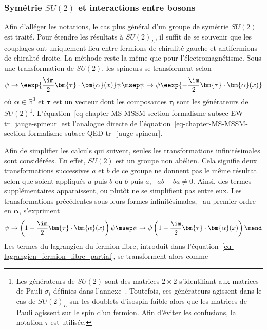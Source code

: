 \subsubsection{Symétrie $SU(2)$ et interactions entre bosons}\label{chapter-MS-MSSM-section-formalisme-subsec-EW-SU2_general}
Afin d'alléger les notations, le cas plus général d'un groupe de symétrie $SU(2)$ est traité. Pour étendre les résultats à $SU(2)_L$, il suffit de se souvenir que les couplages ont uniquement lieu entre fermions de chiralité gauche et antifermions de chiralité droite.
La méthode reste la même que pour l'électromagnétisme.
Sous une transformation de $SU(2)$, les spineurs se transforment selon
\begin{equation}
\psi \to \eexp{\frac{\im}{2}\bm{\tau}\cdot\bm{\alpha}(x)}\psi
\msep
\bar{\psi} \to \bar{\psi}\eexp{-\frac{\im}{2}\bm{\tau}\cdot\bm{\alpha}(x)}
\label{eq-chapter-MS-MSSM-section-formalisme-subsec-EW-tr_jauge-spineur}
\end{equation}
où $\bm{\alpha}\in\mathbb{R}^3$ et $\bm{\tau}$ est un vecteur dont les composantes $\tau_i$ sont les générateurs de $SU(2)$\footnote{Les générateurs de $SU(2)$ sont des matrices $2\times2$ s'identifiant aux matrices de Pauli $\sigma_i$ définies dans l'annexe~. Toutefois, ces générateurs agissent dans le cas de $SU(2)_L$ sur les doublets d'isospin faible alors que les matrices de Pauli agissent sur le spin d'un fermion. Afin d'éviter les confusions, la notation $\tau$ est utilisée.}.
L'équation~\eqref{eq-chapter-MS-MSSM-section-formalisme-subsec-EW-tr_jauge-spineur} est l'analogue directe de l'équation~\eqref{eq-chapter-MS-MSSM-section-formalisme-subsec-QED-tr_jauge-spineur}.
\par Afin de simplifier les calculs qui suivent, seules les transformations infinitésimales sont considérées. En effet, $SU(2)$ est un groupe non abélien. Cela signifie deux transformations successives $a$ et $b$ de ce groupe ne donnent pas le même résultat selon que soient appliqués $a$ puis $b$ ou $b$ puis $a$, \ie\ $ab-ba\neq0$. Ainsi, des termes supplémentaires apparaissent, ou plutôt ne se simplifient pas entre eux. Les transformations précédentes sous leurs formes infinitésimales, \ie\ au premier ordre en $\bm{\alpha}$, s'expriment
\begin{equation}
\psi \to \left(1+\frac{\im}{2}\bm{\tau}\cdot\bm{\alpha}(x)\right)\psi
\msep
\bar{\psi} \to \bar{\psi}\left(1-\frac{\im}{2}\bm{\tau}\cdot\bm{\alpha}(x)\right)
\mend
\end{equation}
Les termes du lagrangien du fermion libre, introduit dans l'équation~\eqref{eq-lagrangien_fermion_libre_partial}, se transforment alors comme
